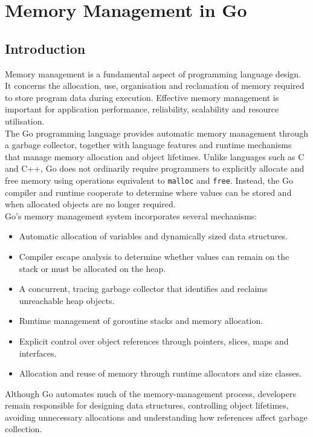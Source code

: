 \section{Memory Management in Go}

\subsection{Introduction}

Memory management is a fundamental aspect of programming language design. It concerns the allocation, use, organisation and reclamation of memory required to store program data during execution. Effective memory management is important for application performance, reliability, scalability and resource utilisation.\\

The Go programming language provides automatic memory management through a garbage collector, together with language features and runtime mechanisms that manage memory allocation and object lifetimes. Unlike languages such as C and C++, Go does not ordinarily require programmers to explicitly allocate and free memory using operations equivalent to \texttt{malloc} and \texttt{free}. Instead, the Go compiler and runtime cooperate to determine where values can be stored and when allocated objects are no longer required.\\

Go's memory management system incorporates several mechanisms:

\begin{itemize}
    \item Automatic allocation of variables and dynamically sized data structures.
    \item Compiler escape analysis to determine whether values can remain on the stack or must be allocated on the heap.
    \item A concurrent, tracing garbage collector that identifies and reclaims unreachable heap objects.
    \item Runtime management of goroutine stacks and memory allocation.
    \item Explicit control over object references through pointers, slices, maps and interfaces.
    \item Allocation and reuse of memory through runtime allocators and size classes.
\end{itemize}

Although Go automates much of the memory-management process, developers remain responsible for designing data structures, controlling object lifetimes, avoiding unnecessary allocations and understanding how references affect garbage collection.


